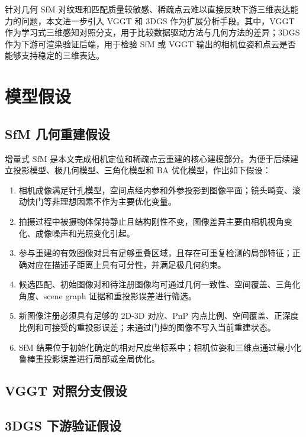 \documentclass[lang=cn,a4paper,newtx]{elegantpaper} %
\begin{document}
针对几何 SfM 对纹理和匹配质量较敏感、稀疏点云难以直接反映下游三维表达能力的问题，本文进一步引入 VGGT 和 3DGS 作为扩展分析手段。其中，VGGT 作为学习式三维感知对照分支，用于比较数据驱动方法与几何方法的差异；3DGS 作为下游可渲染验证后端，用于检验 SfM 或 VGGT 输出的相机位姿和点云是否能够支持稳定的三维表达。

\section{模型假设}
\subsection{SfM 几何重建假设}
增量式 SfM 是本文完成相机定位和稀疏点云重建的核心建模部分。为便于后续建立投影模型、极几何模型、三角化模型和 BA 优化模型，作出如下假设：
\begin{enumerate}
    \item 相机成像满足针孔模型，空间点经内参和外参投影到图像平面；镜头畸变、滚动快门等非理想因素不作为主要优化变量。
    \item 拍摄过程中被摄物体保持静止且结构刚性不变，图像差异主要由相机视角变化、成像噪声和光照变化引起。
    \item 参与重建的有效图像对具有足够重叠区域，且存在可重复检测的局部特征；正确对应在描述子距离上具有可分性，并满足极几何约束。
    \item 候选匹配、初始图像对和待注册图像均可通过几何一致性、空间覆盖、三角化角度、scene graph 证据和重投影误差进行筛选。
    \item 新图像注册必须具有足够的 2D-3D 对应、PnP 内点比例、空间覆盖、正深度比例和可接受的重投影误差；未通过门控的图像不写入当前重建状态。
    \item SfM 结果位于初始化确定的相对尺度坐标系中；相机位姿和三维点通过最小化鲁棒重投影误差进行局部或全局优化。
\end{enumerate}

\subsection{VGGT 对照分支假设}

\subsection{3DGS 下游验证假设}

\end{document}
